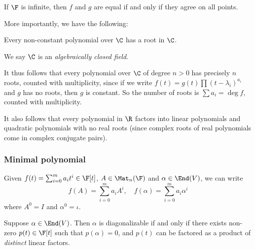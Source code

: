 \documentclass[a4paper]{article}
\begin{document}
\begin{cor}
  If $\F$ is infinite, then $f$ and $g$ are equal if and only if they agree on all points.
\end{cor}

More importantly, we have the following:
\begin{thm}
  Every non-constant polynomial over $\C$ has a root in $\C$.
\end{thm}
We say $\C$ is an \emph{algebraically closed field}.

It thus follows that every polynomial over $\C$ of degree $n > 0$ has precisely $n$ roots, counted with multiplicity, since if we write $f(t) = g(t)\prod (t - \lambda_i)^{a_i}$ and $g$ has no roots, then $g$ is constant. So the number of roots is $\sum a_i = \deg f$, counted with multiplicity.

It also follows that every polynomial in $\R$ factors into linear polynomials and quadratic polynomials with no real roots (since complex roots of real polynomials come in complex conjugate pairs).

\subsubsection{Minimal polynomial}

\begin{notation}
  Given $f(t) = \sum_{i = 0}^m a_i t^i \in \F[t]$, $A \in \Mat_n(\F)$ and $\alpha \in \End(V)$, we can write
  \[
    f(A) = \sum_{i = 0}^m a_i A^i,\quad f(\alpha) = \sum_{i = 0}^m a_i \alpha^i
  \]
  where $A^0 = I$ and $\alpha^0 = \iota$.
\end{notation}

\begin{thm}
  Suppose $\alpha \in \End(V)$. Then $\alpha$ is diagonalizable if and only if there exists non-zero $p(t) \in \F[t]$ such that $p(\alpha) = 0$, and $p(t)$ can be factored as a product of \emph{distinct} linear factors.
\end{thm}
\end{document}
